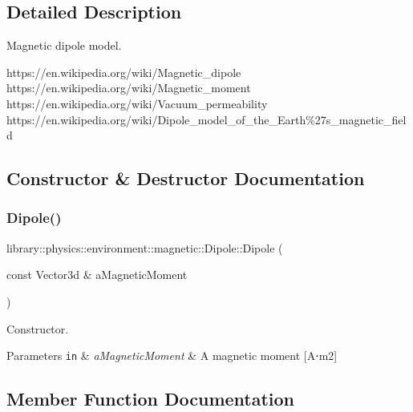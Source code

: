 \subsection{Detailed Description}
Magnetic dipole model. 

https\+://en.wikipedia.\+org/wiki/\+Magnetic\+\_\+dipole https\+://en.wikipedia.\+org/wiki/\+Magnetic\+\_\+moment https\+://en.wikipedia.\+org/wiki/\+Vacuum\+\_\+permeability https\+://en.wikipedia.\+org/wiki/\+Dipole\+\_\+model\+\_\+of\+\_\+the\+\_\+\+Earth\%27s\+\_\+magnetic\+\_\+field 

\subsection{Constructor \& Destructor Documentation}
\mbox{\label{classlibrary_1_1physics_1_1environment_1_1magnetic_1_1_dipole_aaf456bb3bbfd0db11f481dada42ef693}} 
\subsubsection{\texorpdfstring{Dipole()}{Dipole()}}
{\footnotesize\ttfamily library\+::physics\+::environment\+::magnetic\+::\+Dipole\+::\+Dipole (\begin{DoxyParamCaption}\item[{const Vector3d \&}]{a\+Magnetic\+Moment }\end{DoxyParamCaption})}



Constructor. 


\begin{DoxyParams}[1]{Parameters}
\mbox{\tt in}  & {\em a\+Magnetic\+Moment} & A magnetic moment \mbox{[}A⋅m2\mbox{]} \\
\hline
\end{DoxyParams}


\subsection{Member Function Documentation}
\mbox{\label{classlibrary_1_1physics_1_1environment_1_1magnetic_1_1_dipole_abeeb539f682bfd435309c380cf524af2}} 
